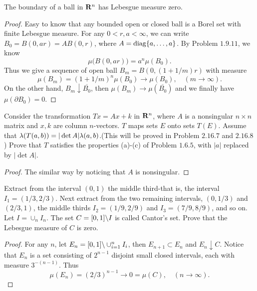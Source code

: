 \begin{pro}%
	The boundary of a ball in $\mathbf{R}^n$ has Lebesgue measure zero.
\end{pro}
\begin{proof}
	Easy to know that any bounded open or closed ball is a Borel set with finite Lebesgue measure. For any $0<r,a<\infty$, we can write
	$B_0=B(0,ar)=AB(0,r)$, where $A=\operatorname*{diag}\{a,\ldots,a\}$. By Problem $1.9.11$, we know
	\[\mu\big(B(0,ar)\big)=a^n \mu(B_0).\]
	Thus we give a sequence of open ball $B_m=B(0,(1+1/m)r)$ with measure 
	\[\mu(B_m)=(1+1/m)^n \mu(B_0)\to\mu(B_0),\quad (m\to\infty).\]
	On the other hand, $B_m\downarrow \overline{B_0}$, then $\mu(B_m)\to \mu(\overline{B_0})$ and we finally have $\mu(\partial B_0)=0$.
\end{proof}

\begin{pro}%
	Consider the transformation $Tx=Ax+k$ in $\mathbf{R}^n$, where $A$ is a nonsingular $n\times n$ matrix and $x,k$ are column $n$-vectors.
	$T$ maps sets $E$ onto sets $T(E)$. Assume that $\lambda(T(a,b))=|\det A|\lambda(a,b)$.(This will be proved in Problem $2.16.7$ and $2.16.8$) Prove that $T$ satisfies the properties (a)-(c) of Problem $1.6.5$, with $|a|$ replaced by $|\det A|$.
\end{pro}
\begin{proof}
	The similar way by noticing that $A$ is nonsingular.
\end{proof}

\begin{pro}%
	Extract from the interval $(0,1)$ the middle third-that is, the interval $I_1=(1/3,2/3)$. Next extract from the two remaining intervals, $(0,1/3)$ and $(2/3,1)$, the middle thirds $I_2=(1/9,2/9)$ and $I_3=(7/9,8/9)$, and so on. Let $I=\cup_n I_n$. The set $C=[0,1]\backslash I$ is called Cantor's set. Prove that the Lebesgue measure of $C$ is zero.
\end{pro}
\begin{proof}
	For any $n$, let $E_n=[0,1]\backslash \cup_{i=1}^n I_i$, then $E_{n+1}\subset E_n$ and $E_n\downarrow C$. Notice that $E_n$ is a set consisting of $2^{n-1}$ disjoint small closed intervals, each with measure $3^{-(n-1)}$. Thus
	 \[\mu(E_n)=(2/3)^{n-1}\to 0=\mu(C),\quad (n\to\infty).\]
\end{proof}

